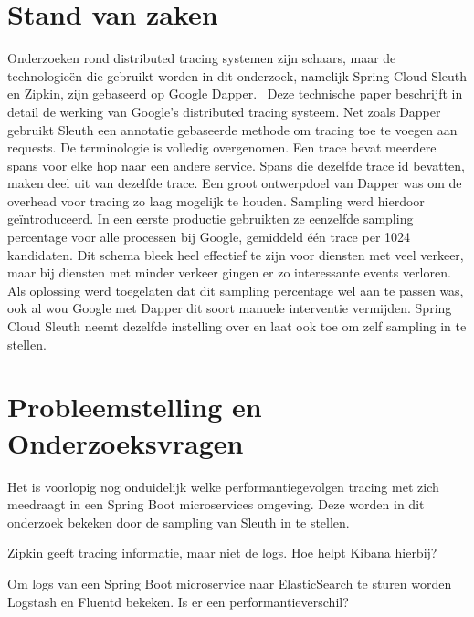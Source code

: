 \section{Stand van zaken}
\label{sec:stand-van-zaken}


Onderzoeken rond distributed tracing systemen zijn schaars, maar de technologieën die gebruikt worden in dit onderzoek, namelijk Spring Cloud Sleuth en Zipkin, zijn gebaseerd op Google Dapper.~\autocite{Sigelman2010} Deze technische paper beschrijft in detail de werking van Google's distributed tracing systeem. Net zoals Dapper gebruikt Sleuth een annotatie gebaseerde methode om tracing toe te voegen aan requests. De terminologie is volledig overgenomen. Een trace bevat meerdere spans voor elke hop naar een andere service. Spans die dezelfde trace id bevatten, maken deel uit van dezelfde trace. Een groot ontwerpdoel van Dapper was om de overhead voor tracing zo laag mogelijk te houden. Sampling werd hierdoor geïntroduceerd. In een eerste productie gebruikten ze eenzelfde sampling percentage voor alle processen bij Google, gemiddeld één trace per 1024 kandidaten. Dit schema bleek heel effectief te zijn voor diensten met veel verkeer, maar bij diensten met minder verkeer gingen er zo interessante events verloren. Als oplossing werd toegelaten dat dit sampling percentage wel aan te passen was, ook al wou Google met Dapper dit soort manuele interventie vermijden. Spring Cloud Sleuth neemt dezelfde instelling over en laat ook toe om zelf sampling in te stellen.

\section{Probleemstelling en Onderzoeksvragen}
\label{sec:onderzoeksvragen}

Het is voorlopig nog onduidelijk welke performantiegevolgen tracing met zich meedraagt in een Spring Boot microservices omgeving. Deze worden in dit onderzoek bekeken door de sampling van Sleuth in te stellen.

Zipkin geeft tracing informatie, maar niet de logs. Hoe helpt Kibana hierbij?

Om logs van een Spring Boot microservice naar ElasticSearch te sturen worden Logstash en Fluentd bekeken. Is er een performantieverschil?


